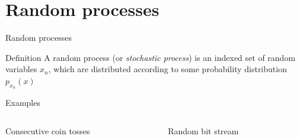 \documentclass[10pt]{beamer}
\begin{document}
\section{Random processes}
\begin{frame}{Random processes}

\begin{block}{Definition}
	A random process (or \textit{stochastic process}) is an indexed set of random variables $x_n$, which are distributed according to some probability distribution $p_{x_n}(x)$
\end{block}	

\begin{block}{Examples}
\begin{columns}
	\begin{column}{0.5\textwidth}
		Consecutive coin tosses
	\end{column}
	\begin{column}{0.5\textwidth}  %
		Random bit stream
	\end{column}
\end{columns}


\end{block}
\end{frame}
\end{document}
